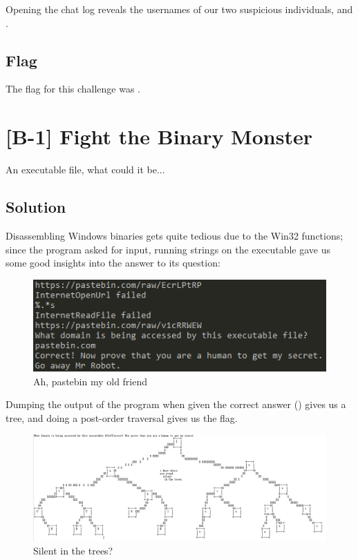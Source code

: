 		Opening the chat log reveals the usernames of our two suspicious individuals,  and .


	\subsection{Flag}
		The flag for this challenge was .



\pagebreak
\section{[B-1] Fight the Binary Monster}

	An executable file, what could it be...

	\subsection{Solution}

		Disassembling Windows binaries gets quite tedious due to the Win32 functions; since the program asked for input, running strings on the
		executable gave us some good insights into the answer to its question:

		\begin{figure}[!htbp]\centering
			\includegraphics[width=130mm]{figures/osintblue/b1a.png} \vspace{5mm}
			\caption{Ah, pastebin my old friend}
		\end{figure}

		Dumping the output of the program when given the correct answer () gives us a tree, and doing a post-order
		traversal gives us the flag.

		\begin{figure}[!htbp]\centering
			\includegraphics[width=130mm]{figures/osintblue/b1b.png} \vspace{5mm}
			\caption{Silent in the trees?}
		\end{figure}


